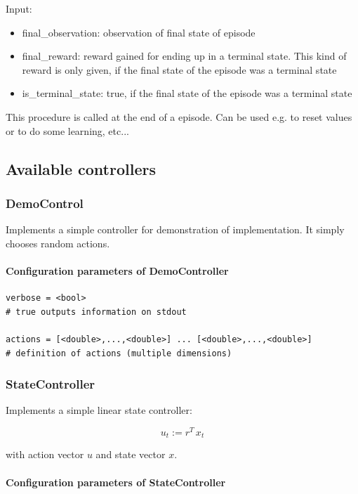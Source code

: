 \documentclass[a4paper,12pt,german]{article}
\newcommand{\ite}{\begin{itemize}}
\newcommand{\eti}{\end{itemize}}
\begin{document}
Input:
\ite
\item final\_observation: observation of final state of episode
\item final\_reward: reward gained for ending up in a terminal state. This kind of reward is only given, if the
final state of the episode was a terminal state
\item is\_terminal\_state: true, if the final state of the episode was a terminal state
\eti

This procedure is called at the end of a  episode. Can be used e.g. to reset values
or to do some learning, etc...



\subsection{Available controllers}

\subsubsection{DemoControl}

Implements  a simple controller for demonstration of implementation. It simply chooses 
random actions.

\paragraph{Configuration parameters of DemoController}

\begin{verbatim}
verbose = <bool> 
# true outputs information on stdout

actions = [<double>,...,<double>] ... [<double>,...,<double>] 
# definition of actions (multiple dimensions)
\end{verbatim}


\subsubsection{StateController}

Implements a simple linear state controller:

\[u_t := r^T\, x_t \]

with action vector $u$ and state vector $x$.

\paragraph{Configuration parameters of StateController}
\end{document}
